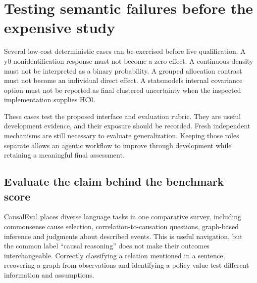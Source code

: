 \section{Testing semantic failures before the expensive study}

Several low-cost deterministic cases can be exercised before live qualification.
A y0 nonidentification response must not become a zero effect. A continuous
density must not be interpreted as a binary probability. A grouped allocation
contrast must not become an individual direct effect. A statsmodels internal
covariance option must not be reported as final clustered uncertainty when the
inspected implementation supplies HC0. \cite{v13_sw_y0,v13_sw_causalgps,v13_sw_inferference,v13_sw_statsmodels}

These cases test the proposed interface and evaluation rubric. They are useful
development evidence, and their exposure should be recorded. Fresh independent
mechanisms are still necessary to evaluate generalization. Keeping those roles
separate allows an agentic workflow to improve through development while
retaining a meaningful final assessment.


\hypertarget{evaluate-the-claim-behind-the-benchmark-score}{%
\subsection{Evaluate the claim behind the benchmark
score}\label{evaluate-the-claim-behind-the-benchmark-score}}

\label{exec13:census-evaluation}

CausalEval places diverse language tasks in one comparative survey,
including commonsense cause selection, correlation-to-causation
questions, graph-based inference and judgments about described events.
This is useful navigation, but the common label ``causal reasoning''
does not make their outcomes interchangeable. Correctly classifying a
relation mentioned in a sentence, recovering a graph from observations
and identifying a policy value test different information and
assumptions. \cite{exec13_census_causaleval}

